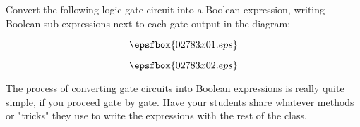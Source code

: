 

Convert the following logic gate circuit into a Boolean expression, writing Boolean sub-expressions next to each gate output in the diagram:

$$\epsfbox{02783x01.eps}$$







$$\epsfbox{02783x02.eps}$$







The process of converting gate circuits into Boolean expressions is really quite simple, if you proceed gate by gate.  Have your students share whatever methods or "tricks" they use to write the expressions with the rest of the class.




